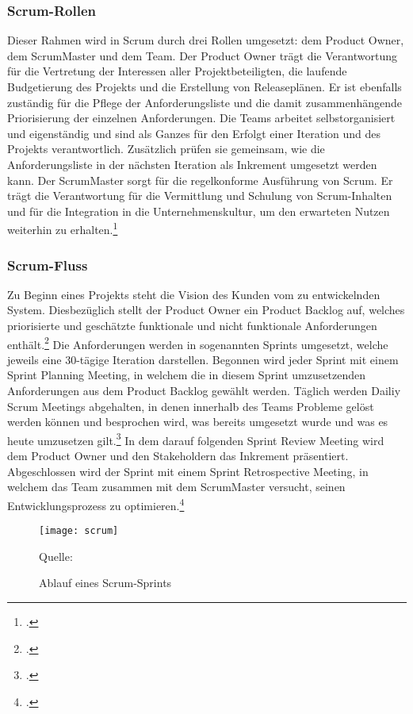\subsubsection{Scrum-Rollen}
Dieser Rahmen wird in Scrum durch drei Rollen umgesetzt: dem Product Owner, dem ScrumMaster und dem Team. Der Product Owner trägt die Verantwortung für die Vertretung der Interessen aller Projektbeteiligten, die laufende Budgetierung des Projekts und die Erstellung von Releaseplänen. Er ist ebenfalls zuständig für die Pflege der Anforderungsliste und die damit zusammenhängende Priorisierung der einzelnen Anforderungen. Die Teams arbeitet selbstorganisiert und eigenständig und sind als Ganzes für den Erfolgt einer Iteration und des Projekts verantwortlich. Zusätzlich prüfen sie gemeinsam, wie die Anforderungsliste in der nächsten Iteration als Inkrement umgesetzt werden kann. Der ScrumMaster sorgt für die regelkonforme Ausführung von Scrum. Er trägt die Verantwortung für die Vermittlung und Schulung von Scrum-Inhalten und für die Integration in die Unternehmenskultur, um den erwarteten Nutzen weiterhin zu erhalten.\footcite[Vgl.][Seite 7]{schwabo}

\subsubsection{Scrum-Fluss}
Zu Beginn eines Projekts steht die Vision des Kunden vom zu entwickelnden System. Diesbezüglich stellt der Product Owner ein Product Backlog auf, welches priorisierte und geschätzte funktionale und nicht funktionale Anforderungen enthält.\footcite[Vgl.][Seite 8]{schwabo} Die Anforderungen werden in sogenannten Sprints umgesetzt, welche jeweils eine 30-tägige Iteration darstellen. Begonnen wird jeder Sprint mit einem Sprint Planning Meeting, in welchem die in diesem Sprint umzusetzenden Anforderungen aus dem Product Backlog gewählt werden. Täglich werden Dailiy Scrum Meetings abgehalten, in denen innerhalb des Teams Probleme gelöst werden können und besprochen wird, was bereits umgesetzt wurde und was es heute umzusetzen gilt.\footcite[Vgl.][]{internet3} In dem darauf folgenden Sprint Review Meeting wird dem Product Owner und den Stakeholdern das Inkrement präsentiert. Abgeschlossen wird der Sprint mit einem Sprint Retrospective Meeting, in welchem das Team zusammen mit dem ScrumMaster versucht, seinen Entwicklungsprozess zu optimieren.\footcite[Vgl.][Seite 9]{schwabo} 

\begin{figure}[H]
\begin{center}
\texttt{[image: scrum]}
\caption{Ablauf eines Scrum-Sprints}
Quelle: \cite[][]{scrumbild}
\end{center}
\end{figure}
\vspace{-1cm}

